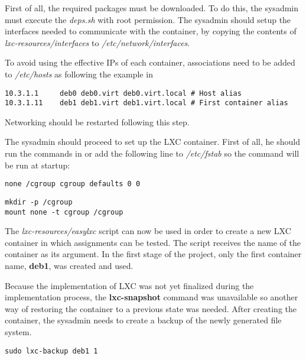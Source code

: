 First of all, the required packages must be downloaded. To do this, the sysadmin
must  execute the \textit{deps.sh} with root permission. The sysadmin should
setup the interfaces needed to communicate with the container, by copying the
contents of \textit{lxc-resources/interfaces} to \textit{/etc/network/interfaces}.

To avoid using the effective IPs of each container, associations need to be 
added to \textit{/etc/hosts} as following the example in 


\lstset{caption=Host Aliases,label=lst:etc-hosts}
\begin{lstlisting}
10.3.1.1     deb0 deb0.virt deb0.virt.local # Host alias
10.3.1.11    deb1 deb1.virt deb1.virt.local # First container alias
\end{lstlisting}

Networking should be restarted following this step.

The sysadmin should proceed to set up the LXC container. First of all, he should 
run the commands in  or add the 
following line to \textit{/etc/fstab} so the command will be run at startup:
\lstset{caption=Permanent mounting of cgroup,label=lst:etc-fstab}
\begin{lstlisting}
none /cgroup cgroup defaults 0 0
\end{lstlisting}

\lstset{caption=Manually Mounting cgroup,label=lst:create-cgroup}
\begin{lstlisting}
mkdir -p /cgroup
mount none -t cgroup /cgroup
\end{lstlisting}

The \textit{lxc-resources/easylxc} script can now be used in order to create
a new LXC container in which assignments can be tested. The script receives the
name of the container as its argument. In the first stage of the project, only the
first container name, \textbf{deb1}, was created and used.

Because the implementation of LXC was not yet finalized during the implementation
process, the \textbf{lxc-snapshot} command was unavailable so
another way of restoring the container to a previous state
was needed. After creating the container, the sysadmin needs to create a backup
of the newly generated file system.

\lstset{caption=Creating a Backup for the File System,label=lst:create-backup}
\begin{lstlisting}
sudo lxc-backup deb1 1
\end{lstlisting}

